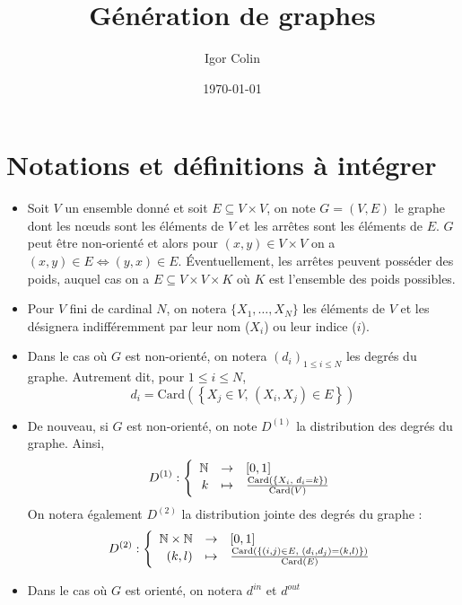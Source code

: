 \documentclass[a4paper]{article}
\title{Génération de graphes}
\author{Igor Colin}
\date{\today}
\newcommand{\tq}{\text{, }}
\newcommand{\card}[1]{\mathrm{Card}\left( #1 \right)}
\begin{document}
\section*{Notations et définitions à intégrer}

\begin{itemize}
    \item Soit $V$ un ensemble donné et soit $E \subseteq V \times V$, on note
        $G = (V, E)$ le graphe dont les n\oe{}uds sont les éléments de $V$
        et les arrêtes sont les éléments de $E$. $G$ peut être non-orienté et
        alors pour $(x, y) \in V \times V$ on a
        $(x, y) \in E \Leftrightarrow (y, x) \in E$. \'Eventuellement, les
        arrêtes peuvent posséder des poids, auquel cas on a
        $E \subseteq V \times V \times K$ où $K$ est l'ensemble des poids
        possibles.
    \item Pour $V$ fini de cardinal $N$, on notera $\{X_1, \ldots, X_N\}$
        les éléments de $V$ et les désignera indifféremment par leur nom
        ($X_i$) ou leur indice ($i$).
    \item Dans le cas où $G$ est non-orienté, on notera $(d_i)_{1 \leq i \leq N}$
        les degrés du graphe. Autrement dit, pour $1 \leq i \leq N$,
        \[
            d_i =
            \mathrm{Card}\left( \left\{
                X_j \in V \tq (X_i, X_j) \in E
            \right\} \right)
        \]
    \item De nouveau, si $G$ est non-orienté, on note $D^{(1)}$ la distribution
        des degrés du graphe. Ainsi,
        \[
            D^{(1)}: \left\{
                \begin{array}{r c l}
                    \mathbb{N} & \rightarrow & [0, 1] \\
                    k & \mapsto & \frac{\card{\left\{ X_i \tq d_i = k \right\}}}{\card{V}}
                \end{array}
            \right.
        \]
        On notera également $D^{(2)}$ la distribution jointe des degrés du
        graphe :
        \[
            D^{(2)}: \left\{
                \begin{array}{r c l}
                    \mathbb{N} \times \mathbb{N} & \rightarrow & [0, 1] \\
                    (k, l) & \mapsto &
                    \frac{\card{ \left\{ (i, j) \in E \tq (d_i, d_j) = (k, l) \right\}}}{\card{E}}
                \end{array}
            \right.
        \]
    \item Dans le cas où $G$ est orienté, on notera $d^{in}$ et $d^{out}$

\end{itemize}
\end{document}
